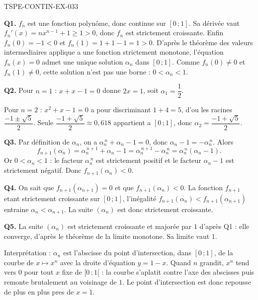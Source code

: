\begin{corrige}{TSPE-CONTIN-EX-033}

\textbf{Q1.} $f_n$ est une fonction polynôme, donc continue sur $[0\,;1]$. Sa dérivée vaut $f_n'(x) = n x^{n-1} + 1 \geq 1 > 0$, donc $f_n$ est strictement croissante. Enfin $f_n(0) = -1 < 0$ et $f_n(1) = 1 + 1 - 1 = 1 > 0$. D'après le théorème des valeurs intermediaires applique a une fonction strictement monotone, l'équation $f_n(x) = 0$ admet une unique solution $\alpha_n$ dans $[0\,;1]$. Comme $f_n(0)
\neq 0$ et $f_n(1)
\neq 0$, cette solution n'est pas une borne : $0 < \alpha_n < 1$.

\textbf{Q2.} Pour $n = 1$ : $x + x - 1 = 0$ donne $2x = 1$, soit $\alpha_1 = \dfrac{1}{2}$.

Pour $n = 2$ : $x^2 + x - 1 = 0$ a pour discriminant $1 + 4 = 5$, d'ou les racines $\dfrac{-1 \pm \sqrt5}{2}$. Seule $\dfrac{-1+\sqrt5}{2} \approx 0{,}618$ appartient a $[0\,;1]$, donc $\alpha_2 = \dfrac{-1+\sqrt5}{2}$.

\textbf{Q3.} Par définition de $\alpha_n$, on a $\alpha_n^{\,n} + \alpha_n - 1 = 0$, donc $\alpha_n - 1 = -\alpha_n^{\,n}$. Alors
\[ f_{n+1}(\alpha_n) = \alpha_n^{\,n+1} + \alpha_n - 1 = \alpha_n^{\,n+1} - \alpha_n^{\,n} = \alpha_n^{\,n}\left(\alpha_n - 1\right). \]
Or $0 < \alpha_n < 1$ : le facteur $\alpha_n^{\,n}$ est strictement positif et le facteur $\alpha_n - 1$ est strictement négatif. Donc $f_{n+1}(\alpha_n) < 0$.

\textbf{Q4.} On sait que $f_{n+1}(\alpha_{n+1}) = 0$ et que $f_{n+1}(\alpha_n) < 0$. La fonction $f_{n+1}$ etant strictement croissante sur $[0\,;1]$, l'inégalité $f_{n+1}(\alpha_n) < f_{n+1}(\alpha_{n+1})$ entraine $\alpha_n < \alpha_{n+1}$. La suite $(\alpha_n)$ est donc strictement croissante.

\textbf{Q5.} La suite $(\alpha_n)$ est strictement croissante et majorée par $1$ d'après Q1 : elle converge, d'après le théorème de la limite monotone. Sa limite vaut $1$.

Interprétation : $\alpha_n$ est l'abscisse du point d'intersection, dans $[0\,;1]$, de la courbe de $x \mapsto x^n$ avec la droite d'équation $y = 1 - x$. Quand $n$ grandit, $x^n$ tend vers $0$ pour tout $x$ fixe de $[0\,;1[$ : la courbe s'aplatit contre l'axe des abscisses puis remonte brutalement au voisinage de $1$. Le point d'intersection est donc repousse de plus en plus pres de $x = 1$.
\end{corrige}

